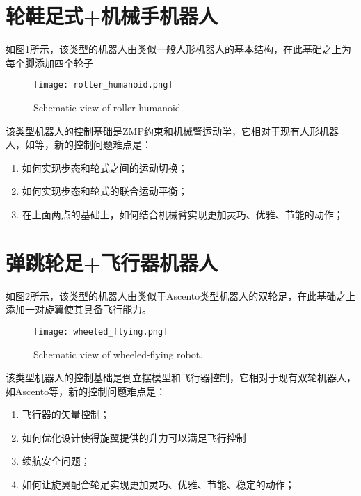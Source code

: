 \section[轮鞋足式+机械手机器人]{轮鞋足式+机械手机器人}
如图\ref{fig:roller_humanoid}所示，该类型的机器人由类似一般人形机器人的基本结构，在此基础之上为每个脚添加四个轮子

\begin{figure}
  \centering
  \texttt{[image: roller\_humanoid.png]}
  \caption[roller_humanoid]{Schematic view of roller humanoid.}
  \label{fig:roller_humanoid}
\end{figure}

该类型机器人的控制基础是ZMP约束和机械臂运动学，它相对于现有人形机器人，如\cite[p]{Herzog_Rotella_Schaal_Righetti_2015, Dietrich_Bussmann_Petit_Kotyczka_Ott_Lohmann_Albu_Schäffer_2015}等，新的控制问题难点是：
\begin{enumerate}
  \item 如何实现步态和轮式之间的运动切换；
  \item 如何实现步态和轮式的联合运动平衡；
  \item 在上面两点的基础上，如何结合机械臂实现更加灵巧、优雅、节能的动作；
\end{enumerate}

\section[弹跳轮足+飞行器机器人]{弹跳轮足+飞行器机器人}
如图\ref{fig:wheeled_flying}所示，该类型的机器人由类似于Ascento\cite[p1]{Klemm_Morra_Salzmann_Tschopp_Bodie_Gulich_Kung_Mannhart_Pfister_Vierneisel_et_al_2019}类型机器人的双轮足，在此基础之上添加一对旋翼使其具备飞行能力。

\begin{figure}
  \centering
  \texttt{[image: wheeled\_flying.png]}
  \caption[short]{Schematic view of wheeled-flying robot.}
  \label{fig:wheeled_flying}
\end{figure}

该类型机器人的控制基础是倒立摆模型和飞行器控制，它相对于现有双轮机器人，如Ascento\cite[p1]{Klemm_Morra_Salzmann_Tschopp_Bodie_Gulich_Kung_Mannhart_Pfister_Vierneisel_et_al_2019}等，新的控制问题难点是：
\begin{enumerate}
  \item 飞行器的矢量控制；
  \item 如何优化设计使得旋翼提供的升力可以满足飞行控制
  \item 续航安全问题；
  \item 如何让旋翼配合轮足实现更加灵巧、优雅、节能、稳定的动作；
\end{enumerate}

